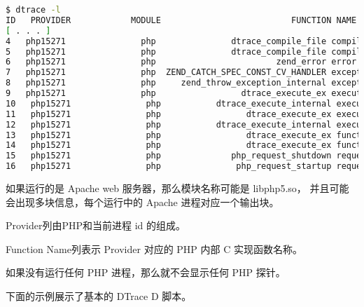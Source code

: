 \begin{lstlisting}[language=bash]
$ dtrace -l
ID   PROVIDER            MODULE                          FUNCTION NAME
[ . . . ]
4   php15271               php               dtrace_compile_file compile-file-entry
5   php15271               php               dtrace_compile_file compile-file-return
6   php15271               php                        zend_error error
7   php15271               php  ZEND_CATCH_SPEC_CONST_CV_HANDLER exception-caught
8   php15271               php     zend_throw_exception_internal exception-thrown
9   php15271               php                 dtrace_execute_ex execute-entry
10   php15271               php           dtrace_execute_internal execute-entry
11   php15271               php                 dtrace_execute_ex execute-return
12   php15271               php           dtrace_execute_internal execute-return
13   php15271               php                 dtrace_execute_ex function-entry
14   php15271               php                 dtrace_execute_ex function-return
15   php15271               php              php_request_shutdown request-shutdown
16   php15271               php               php_request_startup request-startup
\end{lstlisting}

如果运行的是 Apache web 服务器，那么模块名称可能是 libphp5.so， 并且可能会出现多块信息，每个运行中的 Apache 进程对应一个输出块。

\begin{compactitem}
\item Provider列由PHP和当前进程 id 的组成。
\item Function Name列表示 Provider 对应的 PHP 内部 C 实现函数名称。
\end{compactitem}

如果没有运行任何 PHP 进程，那么就不会显示任何 PHP 探针。

下面的示例展示了基本的 DTrace D 脚本。

